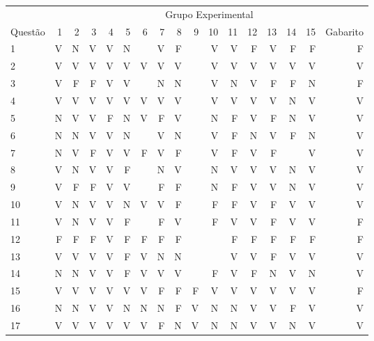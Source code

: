 \begin{apendicesenv}
\begin{center}
	\begin{tabular}{ l r r r r r r r r r r r r r r r r}
	\hline
	& \multicolumn{16}{c}{Grupo Experimental}\\
	\cline{2 - 16} %
	\multirow[c]{-2}{*}{Questão} & \textcolor[rgb]{0.9,0,0}{1} & \textcolor[rgb]{0.9,0,0}{2} & \textcolor[rgb]{0,0,0.9}{3} & \textcolor[rgb]{0,0,0.9}{4} & \textcolor[rgb]{0.9,0,0}{5} & \textcolor[rgb]{0.9,0,0}{6} & \textcolor[rgb]{0,0,0.9}{7} & \textcolor[rgb]{0,0,0.9}{8} & \textcolor[rgb]{0,0,0.9}{9} & \textcolor[rgb]{0.9,0,0}{10} & \textcolor[rgb]{0,0,0.9}{11} & \textcolor[rgb]{0.9,0,0}{12} & \textcolor[rgb]{0,0,0.9}{13} & \textcolor[rgb]{0,0,0.9}{14} & \textcolor[rgb]{0.9,0,0}{15}  & Gabarito\\
	\hline
	1	&	V	&	N	&	V	&	V	&	N	&		&	V	&	F	&		&	V	&	V	&	F	&	V	&	F	&	F	&	F	\\
	2	&	V	&	V	&	V	&	V	&	V	&	V	&	V	&	V	&		&	V	&	V	&	V	&	V	&	V	&	V	&	V	\\
	3	&	V	&	F	&	F	&	V	&	V	&		&	N	&	N	&		&	V	&	N	&	V	&	F	&	F	&	N	&	F	\\
	4	&	V	&	V	&	V	&	V	&	V	&	V	&	V	&	V	&		&	V	&	V	&	V	&	V	&	N	&	V	&	V	\\
	5	&	N	&	V	&	V	&	F	&	N	&	V	&	F	&	V	&		&	N	&	F	&	V	&	F	&	N	&	V	&	V	\\
	6	&	N	&	N	&	V	&	V	&	N	&		&	V	&	N	&		&	V	&	F	&	N	&	V	&	F	&	N	&	V	\\
	7	&	N	&	V	&	F	&	V	&	V	&	F	&	V	&	F	&		&	V	&	F	&	V	&	F	&		&	V	&	V	\\
	8	&	V	&	N	&	V	&	V	&	F	&		&	N	&	V	&		&	N	&	V	&	V	&	V	&	N	&	V	&	V	\\
	9	&	V	&	F	&	F	&	V	&	V	&		&	F	&	F	&		&	N	&	F	&	V	&	V	&	N	&	V	&	V	\\
	10	&	V	&	N	&	V	&	V	&	N	&	V	&	V	&	F	&		&	F	&	F	&	V	&	F	&	V	&	V	&	V	\\
	11	&	V	&	N	&	V	&	V	&	F	&		&	F	&	V	&		&	F	&	V	&	V	&	F	&	V	&	V	&	F	\\
	12	&	F	&	F	&	F	&	V	&	F	&	F	&	F	&	F	&		&		&	F	&	F	&	F	&	F	&	F	&	F	\\
	13	&	V	&	V	&	V	&	V	&	F	&	V	&	N	&	N	&		&		&	V	&	V	&	F	&	V	&	V	&	V	\\
	14	&	N	&	N	&	V	&	V	&	F	&	V	&	V	&	V	&		&	F	&	V	&	F	&	N	&	V	&	N	&	V	\\
	15	&	V	&	V	&	V	&	V	&	V	&	V	&	F	&	F	&	F	&	V	&	V	&	V	&	V	&	V	&	V	&	F	\\
	16	&	N	&	N	&	V	&	V	&	N	&	N	&	N	&	F	&	V	&	N	&	N	&	V	&	V	&	F	&	V	&	V	\\
	17	&	V	&	V	&	V	&	V	&	V	&	V	&	F	&	N	&	V	&	N	&	N	&	V	&	V	&	N	&	V	&	V	\\

\end{tabular}
\end{center}
\end{apendicesenv}
